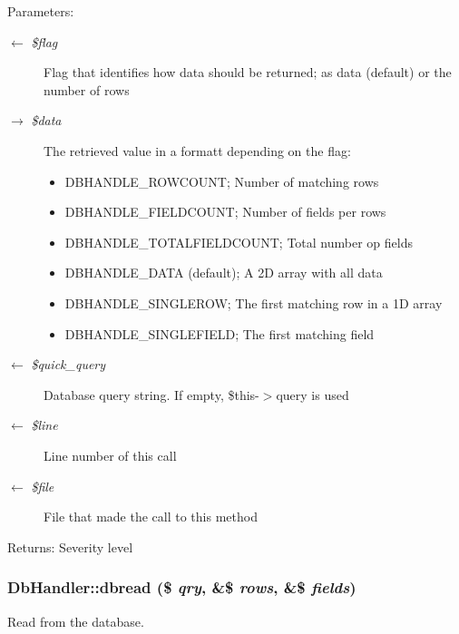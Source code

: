\begin{Desc}
\item[Parameters:]
\begin{description}
\item[\mbox{$\leftarrow$} {\em \$flag}]Flag that identifies how data should be returned; as data (default) or the number of rows \item[\mbox{$\rightarrow$} {\em \$data}]The retrieved value in a formatt depending on the flag:\begin{itemize}
\item DBHANDLE\_\-ROWCOUNT; Number of matching rows\item DBHANDLE\_\-FIELDCOUNT; Number of fields per rows\item DBHANDLE\_\-TOTALFIELDCOUNT; Total number op fields\item DBHANDLE\_\-DATA (default); A 2D array with all data\item DBHANDLE\_\-SINGLEROW; The first matching row in a 1D array\item DBHANDLE\_\-SINGLEFIELD; The first matching field \end{itemize}
\item[\mbox{$\leftarrow$} {\em \$quick\_\-query}]Database query string. If empty, \$this-$>$query is used \item[\mbox{$\leftarrow$} {\em \$line}]Line number of this call \item[\mbox{$\leftarrow$} {\em \$file}]File that made the call to this method \end{description}
\end{Desc}
\begin{Desc}
\item[Returns:]Severity level \end{Desc}
\hypertarget{classDbHandler_130e49aa639fecb46ce6719ddcb0d72f}{
\subsubsection{\setlength{\rightskip}{0pt plus 5cm}DbHandler::dbread (\$ {\em qry}, \&\$ {\em rows}, \&\$ {\em fields})}}
\label{classDbHandler_130e49aa639fecb46ce6719ddcb0d72f}


Read from the database.

